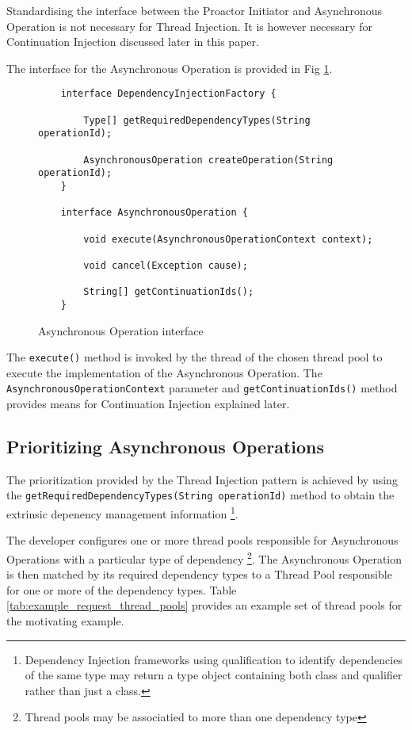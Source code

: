 \documentclass{article}
\begin{document}
Standardising the interface between the Proactor Initiator and Asynchronous
Operation is not necessary for Thread Injection.  It is however necessary for
Continuation Injection discussed later in this paper.

The interface for the Asynchronous Operation is provided in Fig
\ref{fig:AO_interface_AOP}.

\begin{figure}[!h]
\begin{verbatim}
    interface DependencyInjectionFactory {
    
        Type[] getRequiredDependencyTypes(String operationId);
        
        AsynchronousOperation createOperation(String operationId);
    }

    interface AsynchronousOperation {
    
        void execute(AsynchronousOperationContext context);
        
        void cancel(Exception cause);
        
        String[] getContinuationIds();
    }
\end{verbatim}
\caption[Caption for Code]{Asynchronous Operation interface}
\label{fig:AO_interface_AOP}
\end{figure}

The \texttt{execute()} method is invoked by the thread of the chosen thread pool
to execute the implementation of the Asynchronous Operation.  The
\texttt{AsynchronousOperationContext} parameter and \texttt{getContinuationIds()}
method provides means for Continuation Injection explained later.


\subsection{Prioritizing Asynchronous Operations}

The prioritization provided by the Thread Injection pattern is achieved by using
the \texttt{getRequiredDependencyTypes(String operationId)} method to obtain the
extrinsic depenency management information \footnote{Dependency Injection
frameworks using qualification to identify dependencies of the same type may
return a type object containing both class and qualifier rather than just a
class.}.

The developer configures one or more thread pools responsible for Asynchronous
Operations with a particular type of dependency \footnote{Thread pools may be
associatied to more than one dependency type}.  The Asynchronous Operation is
then matched by its required dependency types to a Thread Pool responsible for
one or more of the dependency types. Table
\ref{tab:example_request_thread_pools} provides an example set of thread pools
for the motivating example.
\end{document}

